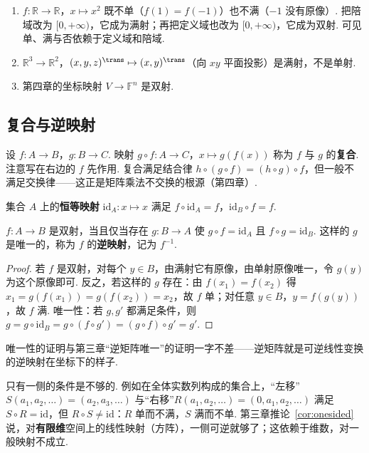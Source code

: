 \begin{example}
	\begin{enumerate}
		\item $f:\mathbb{R}\to\mathbb{R}$，$x\mapsto x^2$ 既不单（$f(1)=f(-1)$）也不满（$-1$ 没有原像）. 把陪域改为 $[0,+\infty)$，它成为满射；再把定义域也改为 $[0,+\infty)$，它成为双射. 可见单、满与否依赖于定义域和陪域.
		\item $\mathbb{R}^3\to\mathbb{R}^2$，$(x,y,z)^\trans\mapsto(x,y)^\trans$（向 $xy$ 平面投影）是满射，不是单射.
		\item 第四章的坐标映射 $V\to\mathbb{F}^n$ 是双射.
	\end{enumerate}
\end{example}

\subsection{复合与逆映射}

设 $f:A\to B$，$g:B\to C$. 映射 $g\circ f:A\to C$，$x\mapsto g(f(x))$ 称为 $f$ 与 $g$ 的\textbf{复合}. 注意写在右边的 $f$ 先作用. 复合满足结合律 $h\circ(g\circ f)=(h\circ g)\circ f$，但一般不满足交换律——这正是矩阵乘法不交换的根源（第四章）.

集合 $A$ 上的\textbf{恒等映射} $\mathrm{id}_A:x\mapsto x$ 满足 $f\circ\mathrm{id}_A=f$，$\mathrm{id}_B\circ f=f$.

\begin{theorem}
	$f:A\to B$ 是双射，当且仅当存在 $g:B\to A$ 使 $g\circ f=\mathrm{id}_A$ 且 $f\circ g=\mathrm{id}_B$. 这样的 $g$ 是唯一的，称为 $f$ 的\textbf{逆映射}，记为 $f^{-1}$.
\end{theorem}
\begin{proof}
	若 $f$ 是双射，对每个 $y\in B$，由满射它有原像，由单射原像唯一，令 $g(y)$ 为这个原像即可. 反之，若这样的 $g$ 存在：由 $f(x_1)=f(x_2)$ 得 $x_1=g(f(x_1))=g(f(x_2))=x_2$，故 $f$ 单；对任意 $y\in B$，$y=f(g(y))$，故 $f$ 满. 唯一性：若 $g,g'$ 都满足条件，则 $g=g\circ\mathrm{id}_B=g\circ(f\circ g')=(g\circ f)\circ g'=g'$.
\end{proof}

唯一性的证明与第三章“逆矩阵唯一”的证明一字不差——逆矩阵就是可逆线性变换的逆映射在坐标下的样子.

\begin{remark}
	只有一侧的条件是不够的. 例如在全体实数列构成的集合上，“左移”$S(a_1,a_2,\ldots)=(a_2,a_3,\ldots)$ 与“右移”$R(a_1,a_2,\ldots)=(0,a_1,a_2,\ldots)$ 满足 $S\circ R=\mathrm{id}$，但 $R\circ S\ne\mathrm{id}$：$R$ 单而不满，$S$ 满而不单. 第三章推论~\ref{cor:onesided} 说，对\textbf{有限维}空间上的线性映射（方阵），一侧可逆就够了；这依赖于维数，对一般映射不成立.
\end{remark}

